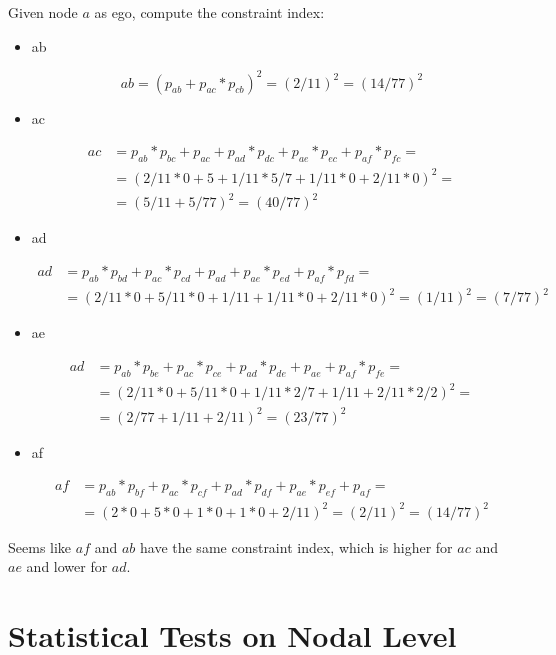 \documentclass[
  notitlepage,
  onecolumn,
  openany]{book}
\begin{document}
Given node \(a\) as ego, compute the constraint index:

\begin{itemize}
\item
  ab

  \[
    ab = (p_{ab}+p_{ac}* p_{cb})^2 =  (2/11)^2 = (14/77)^2
    \]
\item
  ac

  \[
    \begin{aligned}
    ac &= p_{ab}*p_{bc}+p_{ac}+p_{ad}*p_{dc}+p_{ae}*p_{ec}+p_{af}*p_{fc} =\\
    &= (2/11*0+5+1/11*5/7+1/11*0+2/11*0)^2= \\
    &= (5/11+5/77)^2 = (40/77)^2
    \end{aligned}
    \]
\item
  ad

  \[
    \begin{aligned}
    ad &= p_{ab}*p_{bd}+p_{ac}*p_{cd}+p_{ad}+p_{ae}*p_{ed}+p_{af}*p_{fd} =\\
    &= (2/11*0+5/11*0+1/11+1/11*0+2/11*0 )^2= (1/11)^2 = (7/77)^2
    \end{aligned}
    \]
\item
  ae

  \[
    \begin{aligned}
    ad &= p_{ab}*p_{be}+p_{ac}*p_{ce}+p_{ad}*p_{de}+p_{ae}+p_{af}*p_{fe} =\\
    &= (2/11*0+5/11*0+1/11*2/7+1/11+2/11*2/2)^2=\\
    &= (2/77+1/11+2/11) ^2 = (23/77)^2
    \end{aligned}
    \]
\item
  af

  \[
    \begin{aligned}
    af &= p_{ab}*p_{bf}+p_{ac}*p_{cf}+p_{ad}*p_{df}+p_{ae}*p_{ef}+p_{af}=\\
    &= (2*0+5*0+1*0+1*0+2/11)^2 = (2/11)^2 = (14/77)^2
    \end{aligned}
    \]
\end{itemize}

Seems like \(af\) and \(ab\) have the same constraint index, which is higher for \(ac\) and \(ae\) and lower for \(ad\).

\hypertarget{statistical-tests-on-nodal-level}{%
\chapter{Statistical Tests on Nodal Level}\label{statistical-tests-on-nodal-level}}
\end{document}
